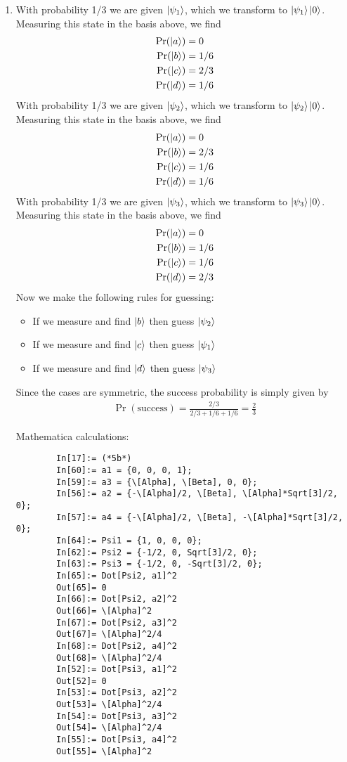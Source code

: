 \documentclass{article}
\theoremstyle{definition}
\newcommand{\f}[2]{\frac{#1}{#2}}
\begin{document}
\begin{enumerate}[label=(\alph*)]
	
	\item With probability 1/3 we are given $\ket{\psi_1}$, which we transform to $\ket{\psi_1}\ket{0}$. Measuring this state in the basis above, we find 
	\begin{align*}
		\Pr(\ket{a}) &= 0\\
		\Pr(\ket{b}) &= 1/6\\
		\Pr(\ket{c}) &= 2/3 \\
		\Pr(\ket{d}) &= 1/6 
	\end{align*}
	With probability 1/3 we are given $\ket{\psi_2}$, which we transform to $\ket{\psi_2}\ket{0}$. Measuring this state in the basis above, we find 
	\begin{align*}
		\Pr(\ket{a}) &= 0\\
		\Pr(\ket{b}) &= 2/3\\
		\Pr(\ket{c}) &= 1/6 \\
		\Pr(\ket{d}) &= 1/6
	\end{align*}
	With probability 1/3 we are given $\ket{\psi_3}$, which we transform to $\ket{\psi_3}\ket{0}$. Measuring this state in the basis above, we find 
	\begin{align*}
		\Pr(\ket{a}) &= 0\\
		\Pr(\ket{b}) &= 1/6\\
		\Pr(\ket{c}) &= 1/6 \\
		\Pr(\ket{d}) &= 2/3
	\end{align*}
	Now we make the following rules for guessing:
	\begin{itemize}
		\item If we measure and find $\ket{b}$ then guess $\ket{\psi_2}$
		
		\item If we measure and find $\ket{c}$ then guess $\ket{\psi_1}$ 
		
		\item If we measure and find $\ket{d}$ then guess $\ket{\psi_3}$
	\end{itemize}

	Since the cases are symmetric, the success probability is simply given by 
	\begin{align*}
		\Pr(\text{success}) = \f{2/3}{2/3+1/6+1/6} = \f{2}{3}
	\end{align*}

	Mathematica calculations:
	\begin{lstlisting}
		In[17]:= (*5b*)
		In[60]:= a1 = {0, 0, 0, 1};
		In[59]:= a3 = {\[Alpha], \[Beta], 0, 0};
		In[56]:= a2 = {-\[Alpha]/2, \[Beta], \[Alpha]*Sqrt[3]/2, 0};
		In[57]:= a4 = {-\[Alpha]/2, \[Beta], -\[Alpha]*Sqrt[3]/2, 0};
		In[64]:= Psi1 = {1, 0, 0, 0};
		In[62]:= Psi2 = {-1/2, 0, Sqrt[3]/2, 0};
		In[63]:= Psi3 = {-1/2, 0, -Sqrt[3]/2, 0};
		In[65]:= Dot[Psi2, a1]^2
		Out[65]= 0
		In[66]:= Dot[Psi2, a2]^2
		Out[66]= \[Alpha]^2		
		In[67]:= Dot[Psi2, a3]^2		
		Out[67]= \[Alpha]^2/4		
		In[68]:= Dot[Psi2, a4]^2		
		Out[68]= \[Alpha]^2/4		
		In[52]:= Dot[Psi3, a1]^2		
		Out[52]= 0		
		In[53]:= Dot[Psi3, a2]^2		
		Out[53]= \[Alpha]^2/4		
		In[54]:= Dot[Psi3, a3]^2		
		Out[54]= \[Alpha]^2/4		
		In[55]:= Dot[Psi3, a4]^2	
		Out[55]= \[Alpha]^2
	\end{lstlisting}


\end{enumerate}
\end{document}
